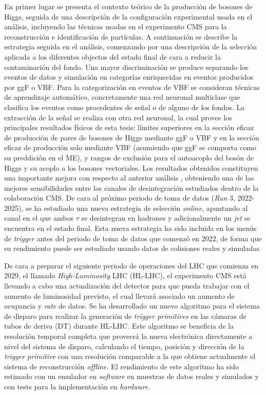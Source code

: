 \documentclass[../main.tex]{subfiles}
\begin{document}
En primer lugar se presenta el contexto teórico de la producción de bosones de Higgs, seguida de una descripción de la configuración experimental usada en el análisis, incluyendo las técnicas usadas en el experimento CMS para la reconstrucción e identificación de partículas. A continuación se describe la estrategia seguida en el análisis, comenzando por una descripción de la selección aplicada a los diferentes objectos del estado final de cara a reducir la contaminación del fondo. Una mayor discriminación se produce separando los eventos de datos y simulación en categorías enriquecidas en eventos producidos por ggF o VBF. Para la categorización en eventos de VBF se consideran técnicas de aprendizaje automático, concretamente una red neuronal multiclase que clasifica los eventos como procedentes de señal o de alguno de los fondos. La extracción de la señal se realiza con otra red neuronal, la cual provee los principales resultados físicos de esta tesis: límites superiores en la sección eficaz de producción de pares de bosones de Higgs mediante ggF o VBF y en la sección eficaz de producción solo mediante VBF (asumiendo que ggF se comporta como su preddición en el ME), y rangos de exclusión para el autoacoplo del bosón de Higgs y su acoplo a los bosones vectoriales. Los resultados obtenidos constituyen una importante mejora con respecto al anterior análisis \hhbbtt{}, obteniendo una de las mejores sensibilidades entre los canales de desintegración estudiados dentro de la colaboración CMS. De cara al próximo periodo de toma de datos (\textit{Run} 3, 2022-2025), se ha estudiado una nueva estrategia de selección \textit{online}, apuntando al canal en el que ambos $\tau$ se desintegran en hadrones y adicionalmente un \textit{jet} se encuentra en el estado final. Esta nueva estrategia ha sido incluida en los menús de \textit{trigger} antes del periodo de toma de datos que comenzó en 2022, de forma que su rendimiento puede ser estudiado usando datos de colisiones reales y simuladas.

De cara a preparar el siguiente periodo de operaciones del LHC que comienza en 2029, el llamado \textit{High-Luminosity} LHC (HL-LHC), el experimento CMS está llevando a cabo una actualización del detector para que pueda trabajar con el aumento de luminosidad previsto, el cual llevará asociado un aumento de ocupancia y \textit{rate} de datos. Se ha desarrollado un nuevo algoritmo para el sistema de disparo para realizar la generación de \textit{trigger primitives} en las cámaras de tubos de deriva (DT) durante HL-LHC. Este algoritmo se beneficia de la resolución temporal completa que proveerá la nueva electrónica directamente a nivel del sistema de disparo, calculando el tiempo, posición y dirección de la \textit{trigger primitive} con una resolución comparable a la que obtiene actualmente el sistema de reconstrucción \textit{offline}. El rendimiento de este algoritmo ha sido estimado con un emulador en \textit{software} en muestras de datos reales y simulados y con tests para la implementación en \textit{hardware}.


\newpage
\end{document}
